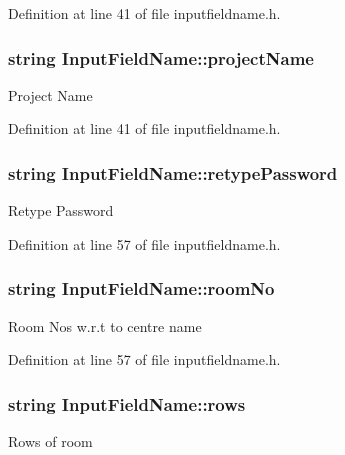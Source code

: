 Definition at line 41 of file inputfieldname.\-h.

\hypertarget{classInputFieldName_ab93b034743570810afe89aea88a7bbf6}{
\subsubsection[{project\-Name}]{\setlength{\rightskip}{0pt plus 5cm}string Input\-Field\-Name\-::project\-Name}}\label{classInputFieldName_ab93b034743570810afe89aea88a7bbf6}
Project Name 

Definition at line 41 of file inputfieldname.\-h.

\hypertarget{classInputFieldName_acd50095ae8540a735bcd5787b904b06c}{
\subsubsection[{retype\-Password}]{\setlength{\rightskip}{0pt plus 5cm}string Input\-Field\-Name\-::retype\-Password}}\label{classInputFieldName_acd50095ae8540a735bcd5787b904b06c}
Retype Password 

Definition at line 57 of file inputfieldname.\-h.

\hypertarget{classInputFieldName_abb6b245e03e76aa29d7ef8733298e72f}{
\subsubsection[{room\-No}]{\setlength{\rightskip}{0pt plus 5cm}string Input\-Field\-Name\-::room\-No}}\label{classInputFieldName_abb6b245e03e76aa29d7ef8733298e72f}
Room Nos w.\-r.\-t to centre name 

Definition at line 57 of file inputfieldname.\-h.

\hypertarget{classInputFieldName_a1b5a819437f52b4bb6b0ea59f542f9a9}{
\subsubsection[{rows}]{\setlength{\rightskip}{0pt plus 5cm}string Input\-Field\-Name\-::rows}}\label{classInputFieldName_a1b5a819437f52b4bb6b0ea59f542f9a9}
Rows of room 

